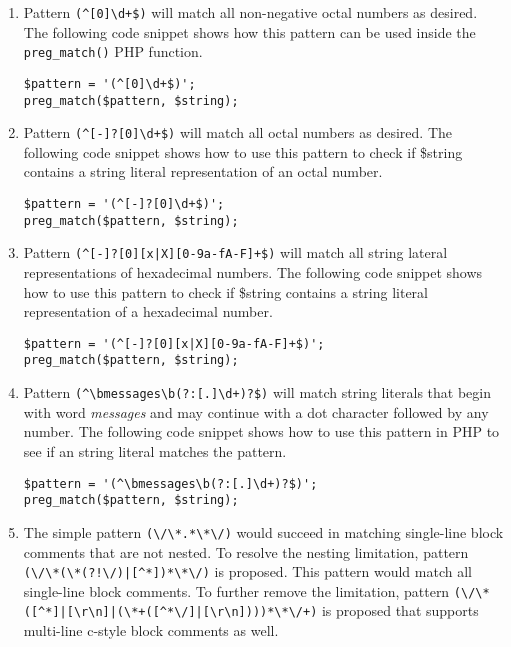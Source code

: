 \begin{enumerate}[label=(\alph*)]
\item Pattern \verb/(^[0]\d+$)/ will match all non-negative octal numbers as desired. The following code snippet shows how this pattern can be used inside the \texttt{preg\_match()} PHP function.

\lstset{language=php, tabsize=2}
\begin{lstlisting}
$pattern = '(^[0]\d+$)';
preg_match($pattern, $string);
\end{lstlisting}

\item Pattern \verb/(^[-]?[0]\d+$)/ will match all octal numbers as desired. The following code snippet shows how to use this pattern to check if \$string contains a string literal representation of an octal number.

\lstset{language=php, tabsize=2}
\begin{lstlisting}
$pattern = '(^[-]?[0]\d+$)';
preg_match($pattern, $string);
\end{lstlisting}

\item Pattern \verb/(^[-]?[0][x|X][0-9a-fA-F]+$)/ will match all string lateral representations of hexadecimal numbers. The following code snippet shows how to use this pattern to check if \$string contains a string literal representation of a hexadecimal number.

\lstset{language=php, tabsize=2}
\begin{lstlisting}
$pattern = '(^[-]?[0][x|X][0-9a-fA-F]+$)';
preg_match($pattern, $string);
\end{lstlisting}

\item Pattern \verb/(^\bmessages\b(?:[.]\d+)?$)/ will match string literals that begin with word \textit{messages} and may continue with a dot character followed by any number. The following code snippet shows how to use this pattern in PHP to see if an string literal matches the pattern.

\lstset{language=php, tabsize=2}
\begin{lstlisting}
$pattern = '(^\bmessages\b(?:[.]\d+)?$)';
preg_match($pattern, $string);
\end{lstlisting}

\item The simple pattern \verb#(\/\*.*\*\/)# would succeed in matching single-line block comments that are not nested. To resolve the nesting limitation, pattern \verb#(\/\*(\*(?!\/)|[^*])*\*\/)# is proposed. This pattern would match all single-line block comments. To further remove the limitation, pattern \verb#(\/\*([^*]|[\r\n]|(\*+([^*\/]|[\r\n])))*\*\/+)# is proposed that supports multi-line c-style block comments as well.

\end{enumerate}
